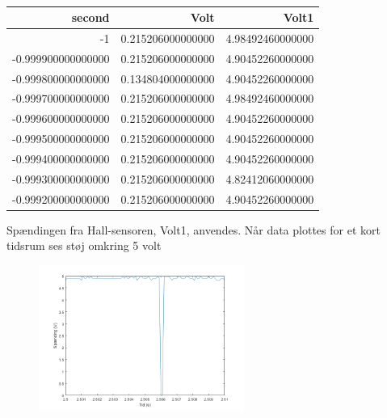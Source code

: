 \begin{table}[h]
  \centering
\begin{tabular}{r|r|r}
\hline
\textbf{second} & \textbf{Volt} & \textbf{Volt1} \\
\hline
-1 & 0.215206000000000 & 4.98492460000000 \\
-0.999900000000000 & 0.215206000000000 & 4.90452260000000 \\
-0.999800000000000 & 0.134804000000000 & 4.90452260000000 \\
-0.999700000000000 & 0.215206000000000 & 4.98492460000000 \\
-0.999600000000000 & 0.215206000000000 & 4.90452260000000 \\
-0.999500000000000 & 0.215206000000000 & 4.90452260000000 \\
-0.999400000000000 & 0.215206000000000 & 4.90452260000000 \\
-0.999300000000000 & 0.215206000000000 & 4.82412060000000 \\
-0.999200000000000 & 0.215206000000000 & 4.90452260000000 \\
\hline
\end{tabular}
  \caption{}
  \label{tab:komp3}
\end{table}

Spændingen fra Hall-sensoren, Volt1, anvendes.
Når data plottes for et kort tidsrum ses støj omkring 5 volt

\begin{figure}[h]
  \centering
  \includegraphics[width=0.6\textwidth]{mo1.png}
  \caption{}
  \label{fig:mo1}
\end{figure}

